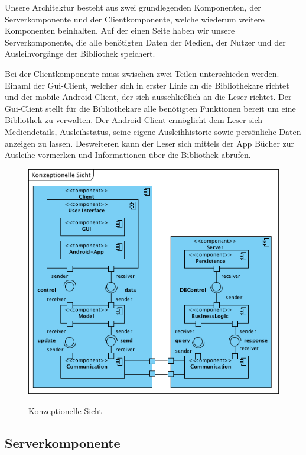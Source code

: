 \documentclass[fontsize=12pt,paper=a4,twoside]{scrartcl}
\begin{document}
Unsere Architektur besteht aus zwei grundlegenden Komponenten, der Serverkomponente und der Clientkomponente, welche wiederum weitere Komponenten beinhalten. Auf der einen Seite haben wir unsere Serverkomponente, die alle benötigten Daten der Medien, der Nutzer und der Ausleihvorgänge der Bibliothek speichert.

Bei der Clientkomponente muss zwischen zwei Teilen unterschieden werden. Einaml der Gui-Client, welcher sich in erster Linie an die Bibliothekare richtet und der mobile Android-Client, der sich ausschließlich an die Leser richtet. 
Der Gui-Client stellt für die Bibliothekare alle benötigten Funktionen bereit um eine Bibliothek zu verwalten. Der Android-Client ermöglicht dem Leser sich Mediendetails, Ausleihstatus, seine eigene Ausleihhistorie sowie persönliche Daten anzeigen zu lassen. Desweiteren kann der Leser sich mittels der App Bücher zur Ausleihe vormerken und Informationen über die Bibliothek abrufen.

\begin{figure} [H] 
\caption{Konzeptionelle Sicht}  \centering
	\includegraphics[scale=1.8]{Diagramme/KonzeptionelleSicht.png} 
	\label{pic:konzeptionellesicht} 
\end{figure}

\subsection{Serverkomponente}
\label{sec:server}
\end{document}
